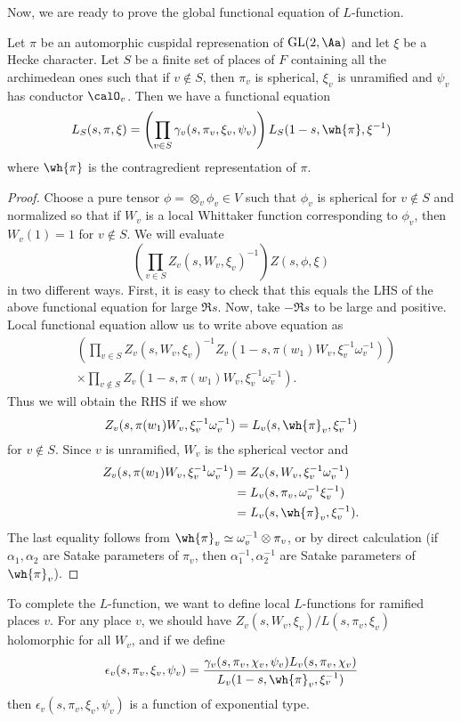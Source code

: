 Now, we are ready to prove the global functional equation of $L$-function. 
\begin{theorem}
Let $\pi$ be an automorphic cuspidal represenation of $\GL(2, \Aa)$ and let $\xi$ be a Hecke character. 
Let $S$ be a finite set of places of $F$ containing all the archimedean ones such that if $v\not\in S$, then $\pi_{v}$ is spherical, $\xi_{v}$ is unramified and $\psi_{v}$ has conductor $\calO_{v}$. 
Then we have a functional equation
$$
L_{S}(s, \pi, \xi) = \left( \prod_{v\in S} \gamma_{v}(s, \pi_{v}, \xi_{v}, \psi_{v})\right) L_{S}(1-s, \wh{\pi}, \xi^{-1})
$$
where $\wh{\pi}$ is the contragredient representation of $\pi$. 
\end{theorem}
\begin{proof}
Choose a pure tensor $\phi = \otimes_{v}\phi_{v}\in V$ such that $\phi_{v}$ is spherical for $v\not\in S$ and normalized so that if $W_{v}$ is a local Whittaker function corresponding to $\phi_{v}$, then $W_{v}(1) =1$ for $v\not\in S$. 
We will evaluate 
$$
\left( \prod_{v\in S} Z_{v}(s, W_{v}, \xi_{v})^{-1} \right) Z(s, \phi, \xi)
$$ 
in two different ways. 
First, it is easy to check that this equals the LHS of the above functional equation for large $\Re s$. 
Now, take $-\Re s$ to be large and positive. 
Local functional equation allow us to write above equation as
\begin{align*}
&\left(\prod_{v\in S} Z_{v}(s, W_{v}, \xi_{v})^{-1}Z_{v}(1-s, \pi(w_{1})W_{v}, \xi_{v}^{-1}\omega_{v}^{-1})\right) \\
&\times \prod_{v\not\in S} Z_{v}(1-s, \pi(w_{1})W_{v}, \xi_{v}^{-1}\omega_{v}^{-1}). 
\end{align*}
Thus we will obtain the RHS if we show 
$$
Z_{v}(s, \pi(w_{1})W_{v}, \xi_{v}^{-1}\omega_{v}^{-1}) = L_{v}(s, \wh{\pi}_{v}, \xi_{v}^{-1})
$$
for $v\not\in S$. 
Since $v$ is unramified, $W_{v}$ is the spherical vector and 
\begin{align*}
Z_{v}(s, \pi(w_{1})W_{v}, \xi_{v}^{-1}\omega_{v}^{-1}) &= Z_{v}(s, W_{v}, \xi_{v}^{-1}\omega_{v}^{-1})\\
&= L_{v}(s, \pi_{v}, \omega_{v}^{-1}\xi_{v}^{-1}) \\
&= L_{v}(s, \wh{\pi}_{v}, \xi_{v}^{-1}).
\end{align*}
The last equality follows from $\wh{\pi}_{v} \simeq \omega_{v}^{-1} \otimes  \pi_{v}$, or by direct calculation (if $\alpha_1, \alpha_2$ are Satake parameters of $\pi_v$, then $\alpha_1^{-1}, \alpha_{2}^{-1}$ are Satake parameters of $\wh{\pi}_v$). 
\end{proof}
To complete the $L$-function, we want to define local $L$-functions for ramified places $v$. 
For any place $v$, we should have $Z_{v}(s, W_{v}, \xi_{v}) / L(s, \pi_v, \xi_v)$ holomorphic for all $W_v$, and if we define 
$$
\epsilon_{v}(s, \pi_v, \xi_v, \psi_v) = \frac{\gamma_v(s, \pi_v, \chi_v, \psi_v)L_v(s, \pi_v, \chi_v)}{L_v(1-s, \wh{\pi}_v, \xi_{v}^{-1})}
$$
then $\epsilon_v(s, \pi_v, \xi_v, \psi_v)$ is a function of exponential type. 

